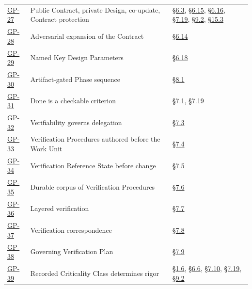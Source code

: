 \begin{longtable}{@{}p{} p{} p{}@{}}
\hyperlink{gp-27}{GP-27} & Public Contract, private Design, co-update, Contract protection & \hyperlink{nss-6.3}{\S6.3}, \hyperlink{nss-6.15}{\S6.15}, \hyperlink{nss-6.16}{\S6.16}, \hyperlink{nss-7.19}{\S7.19}, \hyperlink{nss-9.2}{\S9.2}, \hyperlink{nss-15.3}{\S15.3} \\

\hyperlink{gp-28}{GP-28} & Adversarial expansion of the Contract & \hyperlink{nss-6.14}{\S6.14} \\

\hyperlink{gp-29}{GP-29} & Named Key Design Parameters & \hyperlink{nss-6.18}{\S6.18} \\

\hyperlink{gp-30}{GP-30} & Artifact-gated Phase sequence & \hyperlink{nss-8.1}{\S8.1} \\

\hyperlink{gp-31}{GP-31} & Done is a checkable criterion & \hyperlink{nss-7.1}{\S7.1}, \hyperlink{nss-7.19}{\S7.19} \\

\hyperlink{gp-32}{GP-32} & Verifiability governs delegation & \hyperlink{nss-7.3}{\S7.3} \\

\hyperlink{gp-33}{GP-33} & Verification Procedures authored before the Work Unit & \hyperlink{nss-7.4}{\S7.4} \\

\hyperlink{gp-34}{GP-34} & Verification Reference State before change & \hyperlink{nss-7.5}{\S7.5} \\

\hyperlink{gp-35}{GP-35} & Durable corpus of Verification Procedures & \hyperlink{nss-7.6}{\S7.6} \\

\hyperlink{gp-36}{GP-36} & Layered verification & \hyperlink{nss-7.7}{\S7.7} \\

\hyperlink{gp-37}{GP-37} & Verification correspondence & \hyperlink{nss-7.8}{\S7.8} \\

\hyperlink{gp-38}{GP-38} & Governing Verification Plan & \hyperlink{nss-7.9}{\S7.9} \\

\hyperlink{gp-39}{GP-39} & Recorded Criticality Class determines rigor & \hyperlink{nss-1.6}{\S1.6}, \hyperlink{nss-6.6}{\S6.6}, \hyperlink{nss-7.10}{\S7.10}, \hyperlink{nss-7.19}{\S7.19}, \hyperlink{nss-9.2}{\S9.2} \\


\end{longtable}
